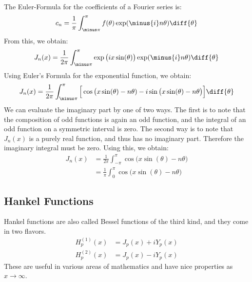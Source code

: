 \documentclass[crop=false,class=book,oneside]{standalone}
\begin{document}
            The Euler-Formula for the coefficients of a Fourier
            series is:
            \begin{equation}
                c_{n}=\frac{1}{\pi}\int_{\minus\pi}^{\pi}
                    f(\theta)\exp(\minus{i}n\theta)\diff{\theta}
            \end{equation}
            From this, we obtain:
            \begin{equation}
                J_{n}(x)=\frac{1}{2\pi}
                    \int_{\minus\pi}^{\pi}
                    \exp\big(ix\sin(\theta)\big)
                    \exp(\minus{i}n\theta)\diff{\theta}
            \end{equation}
            Using Euler's Formula for the exponential function,
            we obtain:
            \begin{equation}
                J_{n}(x)=\frac{1}{2\pi}
                \int_{\minus\pi}^{\pi}\Big[
                    \cos\big(x\sin(\theta)-n\theta)-
                    i\sin\big(x\sin(\theta)-n\theta\big)\Big]
                    \diff{\theta}
            \end{equation}
            We can evaluate the imaginary part by one of two ways.
            The first is to note that the composition of odd
            functions is again an odd function, and the integral
            of an odd function on a symmetric interval is zero.
            The second way is to note that $J_{n}(x)$ is a purely
            real function, and thus has no imaginary part. Therefore
            the imaginary integral must be zero. Using this, we
            obtain:
            \begin{align}
                J_{n}(x)&=\frac{1}{2\pi}\int_{\minus\pi}^{\pi}
                    \cos\big(x\sin(\theta)-n\theta\big)\\
                &=\frac{1}{\pi}\int_{0}^{\pi}
                    \cos\big(x\sin(\theta)-n\theta\big)
            \end{align}
        \subsection{Hankel Functions}
            Hankel functions are also called Bessel functions
            of the third kind, and they come in two flavors.
            \begin{align}
                H_{p}^{(1)}(x)
                    &=J_{p}(x)+iY_{p}(x)\\
                H_{p}^{(2)}(x)&=J_{p}(x)-iY_{p}(x)
            \end{align}
            These are useful in various areas of mathematics and
            have nice properties as $x\rightarrow\infty$.
\end{document}
